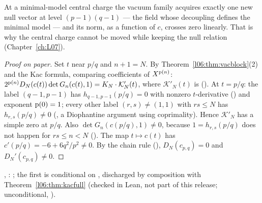 \begin{physics}
At a minimal-model central charge the vacuum family acquires exactly one new null vector at level
$(p-1)(q-1)$ --- the field whose decoupling defines the minimal model --- and its norm, as a function of
$c$, crosses zero linearly. That is why the central charge cannot be moved while keeping the null
relation (Chapter~\ref{ch:L07}).
\end{physics}

\begin{proof}[Proof on paper]
Set $t$ near $p/q$ and $n+1 = N$. By Theorem~\ref{l06:thm:vacblock}(2) and the Kac formula, comparing
coefficients of $X^{\mathrm{p}(n)}$:
$2^{\mathrm{p}(n)}D_N(c(t))\det G_n(c(t),1) = K_N\cdot\mathcal K'_N(t)$, where $\mathcal K'_N(t)$ is
 (\allowbreak{}\allowbreak{}). At $t = p/q$: the label $(q-1,p-1)$ has
$h_{q-1,p-1}(p/q) = 0$ with nonzero $t$-derivative (\allowbreak{}\allowbreak{}) and
exponent $\mathrm{p}(0) = 1$; every other label $(r,s)\ne(1,1)$ with $rs\le N$ has $h_{r,s}(p/q)\ne0$
(\allowbreak{}\allowbreak{}\allowbreak{}, a Diophantine argument using coprimality). Hence
$\mathcal K'_N$ has a simple zero at $p/q$. Also $\det G_n(c(p/q),1)\ne0$, because $1 = h_{r,s}(p/q)$ does
not happen for $rs\le n<N$ (\allowbreak{}\allowbreak{}\allowbreak{}). The map $t\mapsto c(t)$ has
$c'(p/q) = -6+6q^2/p^2\ne0$. By the chain rule (\allowbreak{}\allowbreak{}\allowbreak{}\allowbreak{}),
$D_N(c_{p,q}) = 0$ and $D_N'(c_{p,q})\ne0$.
\end{proof}

\begin{status}
\allowbreak{}\allowbreak{}\allowbreak{}\allowbreak{}\allowbreak{}\allowbreak{}\allowbreak{},
\allowbreak{}\allowbreak{}: \lean{[propext, Classical.}\allowbreak{}\allowbreak\lean{sound]}; the first is
conditional on , discharged by composition with Theorem~\ref{l06:thm:kacfull} (checked in Lean, not part of
this release; unconditional,
\lean{[propext, Classical.}\allowbreak{}\allowbreak\lean{sound]}).
\end{status}


